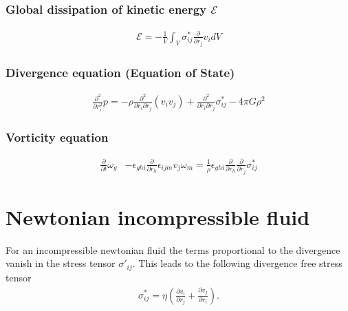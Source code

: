 \documentclass[a4paper,
					12pt,
					twoside,
					openright
					]{book}
\newcommand{\lra}[1]{{ \left( #1 \right) }}
\newcommand{\pd}[1]{\frac{\partial}{\partial #1}}
\newcommand{\ppd}[2]{\frac{\partial #2}{\partial #1}}
\newcommand{\pdd}[1]{\frac{\partial^2}{\partial #1^2}}
\begin{document}
\subsection*{Global dissipation of kinetic energy $\mathcal{E}$}
\begin{align}
\mathcal{E} = 
-\frac{1}{V} \int_V \sigma^*_{ij}\pd{r_j} v_i dV
\label{eq:icdiss}
\end{align}

\subsection*{Divergence equation (Equation of State)}
\begin{align}
\pdd{r_i}p= 
-\rho \frac{\partial^2}{\partial r_i \partial r_j}(v_i v_j)
+\frac{\partial^2}{\partial r_i \partial r_j}\sigma^*_{ij} 
-4\pi G \rho^2
\label{eq:icdiv}
\end{align}

\subsection*{Vorticity equation}
\begin{align}
\pd{t}\omega_g
&-\epsilon_{ghi}\pd{r_h} \epsilon_{ijm} v_j \omega_m =
\frac{1}{\rho}\epsilon_{ghi}\pd{r_h}\pd{r_j}\sigma^*_{ij}
\label{eq:icvort}
\end{align}


\chapter{Newtonian incompressible fluid}
For an incompressible newtonian fluid the terms proportional to the divergence
vanish in the stress tensor $\sigma'_{ij}$. This leads to the following
divergence free stress tensor
\begin{align}
\sigma^*_{ij}=\eta \lra{\ppd{r_j}{v_i}+\ppd{r_i}{v_j}}. 
\label{eq:nicstress}
\end{align}
\end{document}
